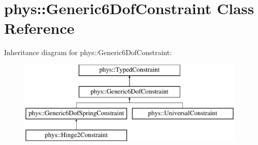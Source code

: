 \hypertarget{classphys_1_1Generic6DofConstraint}{
\section{phys::Generic6DofConstraint Class Reference}
\label{de/d2a/classphys_1_1Generic6DofConstraint}
}
Inheritance diagram for phys::Generic6DofConstraint:\begin{figure}[H]
\begin{center}
\leavevmode
\includegraphics[height=4.000000cm]{de/d2a/classphys_1_1Generic6DofConstraint}
\end{center}
\end{figure}
